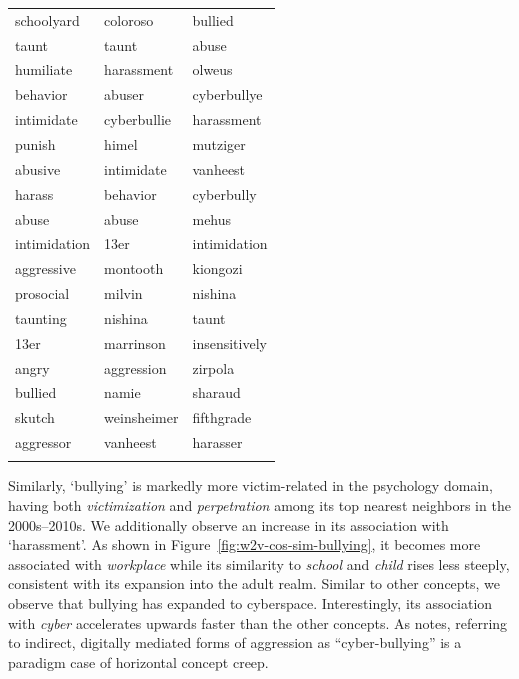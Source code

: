 \documentclass[output=paper]{langsci/langscibook}
\begin{document}
\begin{table}
\begin{tabular}{lll}
schoolyard&coloroso&bullied\\
taunt&taunt&abuse\\
humiliate&harassment&olweus\\
behavior&abuser&cyberbullye\\
intimidate&cyberbullie&harassment\\
punish&himel&mutziger\\
abusive&intimidate&vanheest\\
harass&behavior&cyberbully\\
abuse&abuse&mehus\\
intimidation&13er&intimidation\\
aggressive&montooth&kiongozi\\
prosocial&milvin&nishina\\
taunting&nishina&taunt\\
13er&marrinson&insensitively\\
angry&aggression&zirpola\\
bullied&namie&sharaud\\
skutch&weinsheimer&fifthgrade\\
aggressor&vanheest&harasser\\
\lspbottomrule
\end{tabular}
\end{table}

Similarly, `bullying' is markedly more victim-related in the psychology domain, having both \textit{victimization} and \textit{perpetration} among its top nearest neighbors in the 2000s--2010s. We additionally observe an increase in its association with `harassment'. 
As shown in Figure~\ref{fig:w2v-cos-sim-bullying}, it becomes more associated with \textit{workplace} while its similarity to \textit{school} and \textit{child} rises less steeply, consistent with its expansion into the adult realm. Similar to other concepts, we observe that bullying has expanded to cyberspace. Interestingly, its association with \textit{cyber} accelerates upwards faster than the other concepts. As \citet{haslam2016concept} notes, referring to indirect, digitally mediated forms of aggression as ``cyber-bullying'' is a paradigm case of horizontal concept creep. 
\end{document}
